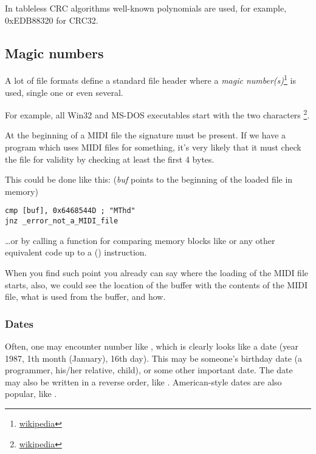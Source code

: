 In tableless CRC algorithms well-known polynomials are used, for example, 0xEDB88320 for CRC32.

\subsection{Magic numbers}
\label{magic_numbers}

\newcommand{\FNURLMAGIC}{\footnote{\href{http://go.yurichev.com/17112}{wikipedia}}}

A lot of file formats define a standard file header where a \emph{magic number(s)}\FNURLMAGIC{} is used, single one or even several.


For example, all Win32 and MS-DOS executables start with the two characters \footnote{\href{http://go.yurichev.com/17113}{wikipedia}}.


At the beginning of a MIDI file the  signature must be present. 
If we have a program which uses MIDI files for something,
it's very likely that it must check the file for validity by checking at least the first 4 bytes.

This could be done like this:
(\emph{buf} points to the beginning of the loaded file in memory)

\begin{lstlisting}[style=customasmx86]
cmp [buf], 0x6468544D ; "MThd"
jnz _error_not_a_MIDI_file
\end{lstlisting}


\dots or by calling a function for comparing memory blocks like  or any other equivalent code
up to a  () instruction.

When you find such point you already can say where the loading of the MIDI file starts,
also, we could see the location
of the buffer with the contents of the MIDI file, what is used from the buffer, and how.

\subsubsection{Dates}


Often, one may encounter number like , which is clearly looks like a date (year 1987, 1th month (January), 16th day).
This may be someone's birthday date (a programmer, his/her relative, child), or some other important date.
The date may also be written in a reverse order, like .
American-style dates are also popular, like .

